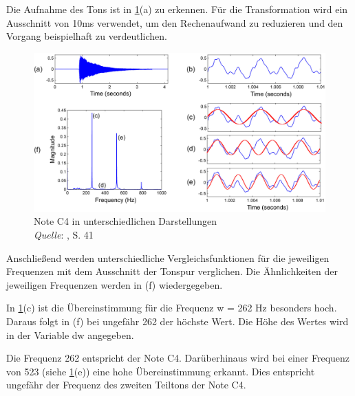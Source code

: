 
Die Aufnahme des Tons ist in \cref{fig:fourier}(a) zu erkennen. Für die Transformation wird ein Ausschnitt von 10ms verwendet, um den Rechenaufwand zu reduzieren und den Vorgang beispielhaft zu verdeutlichen.

%
\begin{figure}[h]
    \includegraphics[width=1\textwidth]{images/Fourier_math.PNG}
    \caption[Note C4 in unterschiedlichen Darstellungen]{Note C4 in unterschiedlichen Darstellungen\\\hspace{\textwidth}\textit{Quelle}: \cite{fundamentals_of_music_processing}, S. 41}
    \label{fig:fourier}
\end{figure}
%

Anschließend werden unterschiedliche Vergleichsfunktionen für die jeweiligen Frequenzen mit dem Ausschnitt der Tonspur verglichen. Die Ähnlichkeiten der jeweiligen Frequenzen werden in (f) wiedergegeben.

\par

In \cref{fig:fourier}(c) ist die Übereinstimmung für die Frequenz w = 262 Hz besonders hoch. Daraus folgt in (f) bei ungefähr 262 der höchste Wert. Die Höhe des Wertes wird in der Variable dw angegeben.


\par

Die Frequenz 262 entspricht der Note C4. Darüberhinaus wird bei einer Frequenz von 523 (siehe \cref{fig:fourier}(e)) eine hohe Übereinstimmung erkannt. Dies entspricht ungefähr der Frequenz des zweiten Teiltons der Note C4.

